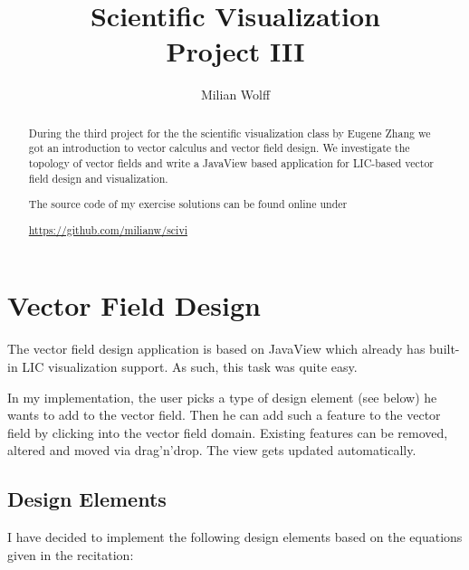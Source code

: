 \documentclass[a4paper,10pt,notitlepage]{scrreprt}
\title{Scientific Visualization\\Project III}
\author{Milian Wolff}
\begin{document}
\maketitle

\begin{abstract}
During the third project for the the scientific visualization class by Eugene
Zhang we got an introduction to vector calculus and vector field design. We
investigate the topology of vector fields and write a JavaView based
application for LIC-based vector field design and visualization.

The source code of my exercise solutions can be found online under

\begin{center}\url{https://github.com/milianw/scivi}\end{center}
\end{abstract}

\begingroup
\let\clearpage\relax

\tableofcontents
\endgroup

\chapter{Vector Field Design}

The vector field design application is based on JavaView which already has
built-in LIC visualization support. As such, this task was quite easy.

In my implementation, the user picks a type of design element (see below) he
wants to add to the vector field. Then he can add such a feature to the vector
field by clicking into the vector field domain. Existing features can be
removed, altered and moved via drag'n'drop. The view gets updated automatically.

\section{Design Elements}

I have decided to implement the following design elements based on the
equations given in the recitation:
\end{document}
